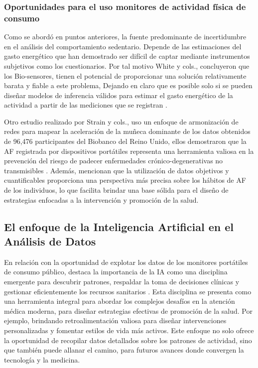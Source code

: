\subsubsection{Oportunidades para el uso monitores de actividad física de consumo}
\label{subsubsec:oportunidades_monitores_af}

Como se abordó en puntos anteriores, la fuente predominante de incertidumbre en el análisis del comportamiento sedentario. Depende de las estimaciones del gasto energético que han demostrado ser difícil de captar mediante instrumentos subjetivos como los cuestionarios. Por tal motivo White y cols., concluyeron que los Bio-sensores, tienen el potencial de proporcionar una solución relativamente barata y fiable a este problema, Dejando en claro que es posible solo si se pueden diseñar modelos de inferencia válidos para estimar el gasto energético de la actividad a partir de las mediciones que se registran \citep{White2019}.

Otro estudio realizado por Strain y cols., uso un enfoque de armonización de redes para mapear la aceleración de la muñeca dominante de los datos obtenidos de 96,476 participantes del Biobanco del Reino Unido, ellos demostraron que la AF registrada por dispositivos portátiles representa una herramienta valiosa en la prevención del riesgo de padecer enfermedades crónico-degenerativas no transmisibles \citep{Strain2020}. Además, mencionan que la utilización de datos objetivos y cuantificables proporciona una perspectiva más precisa sobre los hábitos de AF de los individuos, lo que facilita brindar una base sólida para el diseño de estrategias enfocadas a la intervención y promoción de la salud.

\subsection{El enfoque de la Inteligencia Artificial en el Análisis de Datos}
\label{subsec:enfoque_ia_analisis_datos}

En relación con la oportunidad de explotar los datos de los monitores portátiles de consumo público, destaca la importancia de la IA como una disciplina emergente para descubrir patrones, respaldar la toma de decisiones clínicas y gestionar eficientemente los recursos sanitarios \citep{Yoo2012DataMining}. Esta disciplina se presenta como una herramienta integral para abordar los complejos desafíos en la atención médica moderna, para diseñar estrategias efectivas de promoción de la salud. Por ejemplo, brindando retroalimentación valiosa para diseñar intervenciones personalizadas y fomentar estilos de vida más activos. Este enfoque no solo ofrece la oportunidad de recopilar datos detallados sobre los patrones de actividad, sino que también puede allanar el camino, para futuros avances donde convergen la tecnología y la medicina.

